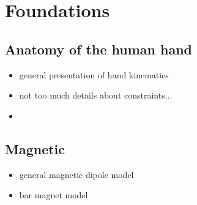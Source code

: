 
\lhead[\chaptername~\thechapter]{\rightmark}

\rhead[\leftmark]{}

\lfoot[\thepage]{}

\cfoot{}

\rfoot[]{\thepage}


\chapter{Foundations}
\label{cha:foundations}

\section{Anatomy of the human hand}
\label{sec:anatomy}
\begin{itemize}
\item general presentation of hand kinematics
\item not too much details about constraints...
\item \cite{john2006advanced}
\end{itemize}

\section{Magnetic}
\label{sec:magneticFound}
\begin{itemize}
\item general magnetic dipole model
\item bar magnet model

\end{itemize}